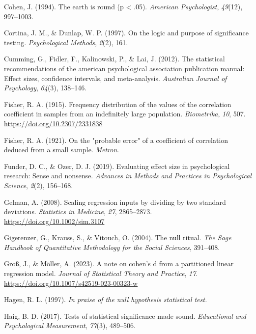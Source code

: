 \documentclass[
  man,floatsintext]{apa7}
\newlength{\cslhangindent}
\newenvironment{CSLReferences}[2] %
 {\begin{list}{}{%
  \setlength{\itemindent}{0pt}
  \setlength{\leftmargin}{0pt}
  \setlength{\parsep}{0pt}
  \ifodd #1
   \setlength{\leftmargin}{\cslhangindent}
   \setlength{\itemindent}{-1\cslhangindent}
  \fi
  \setlength{\itemsep}{#2\baselineskip}}}
 {\end{list}}
\begin{document}
\begin{CSLReferences}{1}{0}
Cohen, J. (1994). The earth is round (p \textless{} .05). \emph{American Psychologist}, \emph{49}(12), 997--1003.

Cortina, J. M., \& Dunlap, W. P. (1997). On the logic and purpose of significance testing. \emph{Psychological Methods}, \emph{2}(2), 161.

Cumming, G., Fidler, F., Kalinowski, P., \& Lai, J. (2012). The statistical recommendations of the american psychological association publication manual: Effect sizes, confidence intervals, and meta-analysis. \emph{Australian Journal of Psychology}, \emph{64}(3), 138--146.

Fisher, R. A. (1915). Frequency distribution of the values of the correlation coefficient in samples from an indefinitely large population. \emph{Biometrika}, \emph{10}, 507. \url{https://doi.org/10.2307/2331838}

Fisher, R. A. (1921). On the "probable error" of a coefficient of correlation deduced from a small sample. \emph{Metron}.

Funder, D. C., \& Ozer, D. J. (2019). Evaluating effect size in psychological research: Sense and nonsense. \emph{Advances in Methods and Practices in Psychological Science}, \emph{2}(2), 156--168.

Gelman, A. (2008). Scaling regression inputs by dividing by two standard deviations. \emph{Statistics in Medicine}, \emph{27}, 2865--2873. \url{https://doi.org/10.1002/sim.3107}

Gigerenzer, G., Krauss, S., \& Vitouch, O. (2004). The null ritual. \emph{The Sage Handbook of Quantitative Methodology for the Social Sciences}, 391--408.

Groß, J., \& Möller, A. (2023). A note on cohen's d from a partitioned linear regression model. \emph{Journal of Statistical Theory and Practice}, \emph{17}. \url{https://doi.org/10.1007/s42519-023-00323-w}

Hagen, R. L. (1997). \emph{In praise of the null hypothesis statistical test.}

Haig, B. D. (2017). Tests of statistical significance made sound. \emph{Educational and Psychological Measurement}, \emph{77}(3), 489--506.


\end{CSLReferences}
\end{document}
